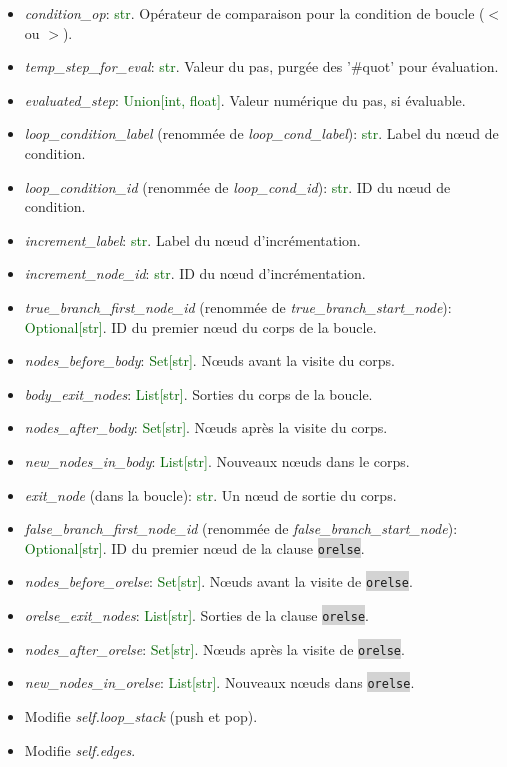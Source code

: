 \documentclass[11pt,a4paper]{article}
\newcommand{\code}[1]{\colorbox{lightgray}{\texttt{\small #1}}}
\newcommand{\var}[1]{\textit{#1}}
\newcommand{\vartype}[1]{\textcolor{darkgreen}{#1}}
\begin{document}
\begin{description}
\begin{itemize}
        \item \var{condition\_op}: \vartype{str}. Opérateur de comparaison pour la condition de boucle ($<$ ou $>$).
        \item \var{temp\_step\_for\_eval}: \vartype{str}. Valeur du pas, purgée des '\#quot' pour évaluation.
        \item \var{evaluated\_step}: \vartype{Union[int, float]}. Valeur numérique du pas, si évaluable.
        \item \var{loop\_condition\_label} (renommée de \var{loop\_cond\_label}): \vartype{str}. Label du nœud de condition.
        \item \var{loop\_condition\_id} (renommée de \var{loop\_cond\_id}): \vartype{str}. ID du nœud de condition.
        \item \var{increment\_label}: \vartype{str}. Label du nœud d'incrémentation.
        \item \var{increment\_node\_id}: \vartype{str}. ID du nœud d'incrémentation.
        \item \var{true\_branch\_first\_node\_id} (renommée de \var{true\_branch\_start\_node}): \vartype{Optional[str]}. ID du premier nœud du corps de la boucle.
        \item \var{nodes\_before\_body}: \vartype{Set[str]}. Nœuds avant la visite du corps.
        \item \var{body\_exit\_nodes}: \vartype{List[str]}. Sorties du corps de la boucle.
        \item \var{nodes\_after\_body}: \vartype{Set[str]}. Nœuds après la visite du corps.
        \item \var{new\_nodes\_in\_body}: \vartype{List[str]}. Nouveaux nœuds dans le corps.
        \item \var{exit\_node} (dans la boucle): \vartype{str}. Un nœud de sortie du corps.
        \item \var{false\_branch\_first\_node\_id} (renommée de \var{false\_branch\_start\_node}): \vartype{Optional[str]}. ID du premier nœud de la clause \code{orelse}.
        \item \var{nodes\_before\_orelse}: \vartype{Set[str]}. Nœuds avant la visite de \code{orelse}.
        \item \var{orelse\_exit\_nodes}: \vartype{List[str]}. Sorties de la clause \code{orelse}.
        \item \var{nodes\_after\_orelse}: \vartype{Set[str]}. Nœuds après la visite de \code{orelse}.
        \item \var{new\_nodes\_in\_orelse}: \vartype{List[str]}. Nouveaux nœuds dans \code{orelse}.
        \item Modifie \var{self.loop\_stack} (push et pop).
        \item Modifie \var{self.edges}.
    \end{itemize}
\end{description}
\end{document}
